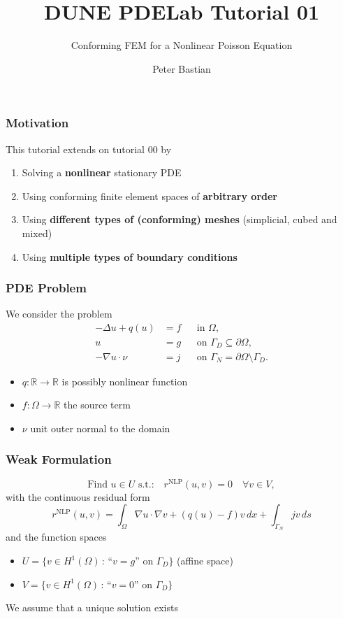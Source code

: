 \documentclass[aspectratio=169,11pt]{beamer}
\title{DUNE PDELab Tutorial 01}
\subtitle{Conforming FEM for a Nonlinear Poisson Equation}
\author{Peter Bastian}
\institute[]
{
  IWR\\
  Heidelberg University
}
\theoremstyle{definition}
\begin{document}


\begin{frame}
\frametitle{Motivation}
This tutorial extends on tutorial 00 by
\begin{enumerate}[1)]
\item Solving a \textbf{nonlinear} stationary PDE
\item Using conforming finite element spaces of \textbf{arbitrary order}
\item Using \textbf{different types of (conforming) meshes} (simplicial, cubed and mixed)
\item Using \textbf{multiple types of boundary conditions}
\end{enumerate}
\end{frame}

\begin{frame}
\frametitle{PDE Problem}
We consider the problem
\begin{subequations} \label{eq:ProblemStrong}
\begin{align}
-\Delta u + q(u) &= f &&\text{in $\Omega$},\\
u &= g &&\text{on $\Gamma_D\subseteq\partial\Omega$},\\
-\nabla u\cdot \nu &= j &&\text{on $\Gamma_N=\partial\Omega\setminus\Gamma_D$}.
\end{align}
\end{subequations}
\begin{itemize}
\item $q:\mathbb{R}\to\mathbb{R}$ is possibly
nonlinear function
\item $f: \Omega\to\mathbb{R}$ the source term
\item $\nu$ unit outer normal to the domain
\end{itemize}
\end{frame}

\begin{frame}
\frametitle{Weak Formulation}
\begin{equation}
\text{Find $u\in U$ s.t.:} \quad r^{\text{NLP}}(u,v)=0 \quad \forall v\in V,
\label{Eq:BasicBuildingBlock}
\end{equation}
with the continuous residual form
\begin{equation*}
r^{\text{NLP}}(u,v) = \int_\Omega \nabla u \cdot \nabla v + (q(u)-f)v\,dx + \int_{\Gamma_N} jv\,ds
\label{eq:ResidualForm}
\end{equation*}
and the function spaces
\begin{itemize}
\item $U= \{v\in H^1(\Omega) \,:\, \text{``$v=g$'' on $\Gamma_D$}\}$ (affine space)
\item $V= \{v\in H^1(\Omega) \,:\, \text{``$v=0$'' on $\Gamma_D$}\}$
\end{itemize}
We assume that a unique solution exists
\end{frame}
\end{document}
